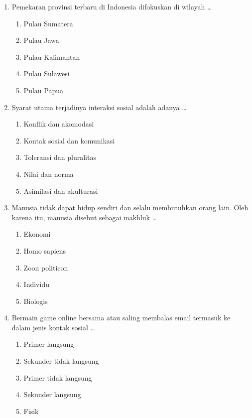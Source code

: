 \documentclass[12pt,a4paper]{article}
\begin{document}
\begin{enumerate}[leftmargin=*]
\item Pemekaran provinsi terbaru di Indonesia difokuskan di wilayah \dots
    \begin{enumerate}[label=\alph*.]
        \item Pulau Sumatera
        \item Pulau Jawa
        \item Pulau Kalimantan
        \item Pulau Sulawesi
        \item Pulau Papua
    \end{enumerate}

\item Syarat utama terjadinya interaksi sosial adalah adanya \dots
    \begin{enumerate}[label=\alph*.]
        \item Konflik dan akomodasi
        \item Kontak sosial dan komunikasi
        \item Toleransi dan pluralitas
        \item Nilai dan norma
        \item Asimilasi dan akulturasi
    \end{enumerate}

\item Manusia tidak dapat hidup sendiri dan selalu membutuhkan orang lain. Oleh karena itu, manusia disebut sebagai makhluk \dots
    \begin{enumerate}[label=\alph*.]
        \item Ekonomi
        \item Homo sapiens
        \item Zoon politicon
        \item Individu
        \item Biologis
    \end{enumerate}

\item Bermain game online bersama atau saling membalas email termasuk ke dalam jenis kontak sosial \dots
    \begin{enumerate}[label=\alph*.]
        \item Primer langsung
        \item Sekunder tidak langsung
        \item Primer tidak langsung
        \item Sekunder langsung
        \item Fisik
    \end{enumerate}


\end{enumerate}
\end{document}
